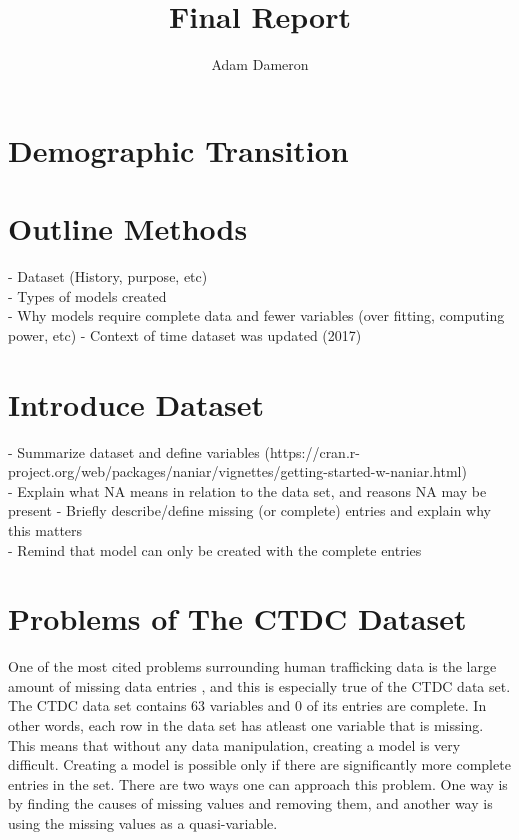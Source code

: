 \documentclass{article} %
\title{Final Report}
\author{
	Adam Dameron
}
\begin{document}
	
	
	\maketitle
	
	\begin{abstract}
		
	\end{abstract}
	
	\section{Demographic Transition}
	
	\section{Outline Methods}
	
	- Dataset (History, purpose, etc)\\
	- Types of models created\\
		- Why models require complete data and fewer variables (over fitting, computing power, etc)
		- Context of time dataset was updated (2017)
	
	
	\section{Introduce Dataset}
	
	- Summarize dataset and define variables (https://cran.r-project.org/web/packages/naniar/vignettes/getting-started-w-naniar.html)\\
	- Explain what NA means in relation to the data set, and reasons NA may be present
	- Briefly describe/define missing (or complete) entries and explain why this matters\\
	- Remind that model can only be created with the complete entries\\
	
	\newpage
	\section{Problems of The CTDC Dataset}
	
	One of the most cited problems surrounding human trafficking data is the large amount of missing data entries \parencite{SlaveBook, polarisTypology}, and this is especially true of the CTDC data set. The CTDC data set contains 63 variables and 0 of its entries are complete. In other words, each row in the data set has atleast one variable that is missing. This means that without any data manipulation, creating a model is very difficult. Creating a model is possible only if there are significantly more complete entries in the set. There are two ways one can approach this problem. One way is by finding the causes of missing values and removing them, and another way is using the missing values as a quasi-variable. 
	
\end{document}
